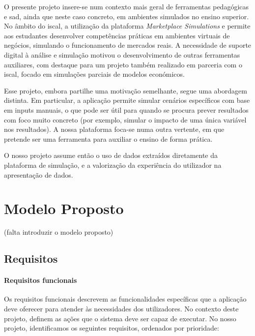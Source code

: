 O presente projeto insere-se num contexto mais geral de ferramentas pedagógicas e \gls{sad}, ainda que neste caso concreto, em ambientes simulados no ensino superior. No âmbito do \gls{iscal}, a utilização da plataforma \textit{Marketplace Simulations} e permite aos estudantes desenvolver competências práticas em ambientes virtuais de negócios, simulando o funcionamento de mercados reais. A necessidade de suporte digital à análise e simulação motivou o desenvolvimento de outras ferramentas auxiliares, com destaque para um projeto também realizado em parceria com o \gls{iscal}, focado em simulações parciais de modelos económicos.

Esse projeto, embora partilhe uma motivação semelhante, segue uma abordagem distinta. Em particular, a aplicação permite simular cenários específicos com base em inputs manuais, o que pode ser útil para quando se procura prever resultados com foco muito concreto (por exemplo, simular o impacto de uma única variável nos resultados). A nossa plataforma foca-se numa outra vertente, em que pretende ser uma ferramenta para auxiliar o ensino de forma prática.

O nosso projeto assume então o uso de dados extraídos diretamente da plataforma de simulação, e a valorização da experiência do utilizador na apresentação de dados. 

\chapter{Modelo Proposto}
\label{ch:modeloProposto}

(falta introduzir o modelo proposto)


\section{Requisitos}
\label{sec:requisitos}

\subsubsection{Requisitos funcionais}
Os requisitos funcionais descrevem as funcionalidades específicas que a aplicação deve oferecer para atender às necessidades dos utilizadores. No contexto deste projeto, definem as ações que o sistema deve ser capaz de executar. No nosso projeto, identificamos os seguintes requisitos, ordenados por prioridade:

